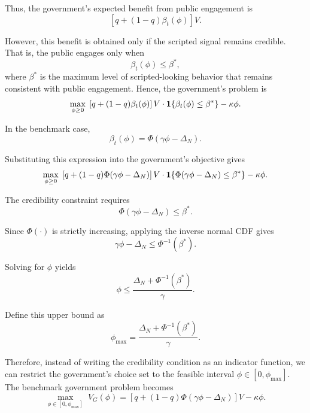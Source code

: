 Thus, the government's expected benefit from public engagement is
\begin{equation}
    \left[q+(1-q)\beta_t(\phi)\right]V.
\end{equation}

However, this benefit is obtained only if the scripted signal remains credible. 
That is, the public engages only when
\begin{equation}
    \beta_t(\phi) \leq \beta^*,
\end{equation}
where $\beta^*$ is the maximum level of scripted-looking behavior that remains 
consistent with public engagement. Hence, the government's problem is
\begin{equation}
    \max_{\phi \geq 0} \;
    \left[q+(1-q)\beta_t(\phi)\right]V
    \cdot \mathbf{1}\{\beta_t(\phi)\leq \beta^*\}
    -\kappa\phi.
\end{equation}

In the benchmark case,
\begin{equation}
    \beta_t(\phi)=\Phi(\gamma\phi-\Delta_N).
\end{equation}

Substituting this expression into the government's objective gives
\begin{equation}
    \max_{\phi \geq 0} \;
    \left[q+(1-q)\Phi(\gamma\phi-\Delta_N)\right]V
    \cdot \mathbf{1}\{\Phi(\gamma\phi-\Delta_N)\leq \beta^*\}
    -\kappa\phi.
\end{equation}

The credibility constraint requires
\begin{equation}
    \Phi(\gamma\phi-\Delta_N)\leq \beta^*.
\end{equation}

Since $\Phi(\cdot)$ is strictly increasing, applying the inverse normal CDF gives
\begin{equation}
    \gamma\phi-\Delta_N \leq \Phi^{-1}(\beta^*).
\end{equation}

Solving for $\phi$ yields
\begin{equation}
    \phi \leq \frac{\Delta_N+\Phi^{-1}(\beta^*)}{\gamma}.
\end{equation}

Define this upper bound as
\begin{equation}
    \phi_{\max}
    =
    \frac{\Delta_N+\Phi^{-1}(\beta^*)}{\gamma}.
\end{equation}

Therefore, instead of writing the credibility condition as an indicator function, 
we can restrict the government's choice set to the feasible interval 
$\phi \in [0,\phi_{\max}]$. The benchmark government problem becomes
\begin{equation}
    \max_{\phi \in [0,\phi_{\max}]} \;
    V_G(\phi)
    =
    \left[q+(1-q)\Phi(\gamma\phi-\Delta_N)\right]V
    -\kappa\phi.
\end{equation}

